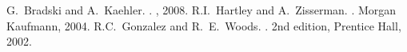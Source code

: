 \documentclass[12pt,A4]{article}
\begin{document}
\begin{thebibliography}{10}
G.~Bradski and A.~Kaehler.
. 
, 2008.
    R.I.~Hartley and A.~Zisserman.
    .
    \newblock Morgan Kaufmann, 2004.
    R.C.~Gonzalez and R.~E.~Woods.
    .
    \newblock 2nd edition, Prentice Hall, 2002.
\end{thebibliography}

\vfill

\end{document}
